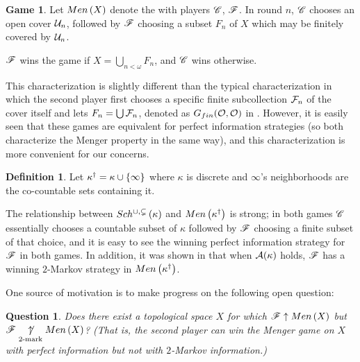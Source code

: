 \documentclass{amsart}
\theoremstyle{plain}
\newtheorem{question}[theorem]{Question}
\theoremstyle{definition}
\newtheorem{definition}[theorem]{Definition}
\newtheorem{game}[theorem]{Game}
\theoremstyle{remark}
\theoremstyle{plain}
\theoremstyle{definition}
\theoremstyle{remark}
\begin{document}
  \begin{game}
    Let \(Men\left({X}\right)\) denote the  with players \(\mathscr{C}\),
    \(\mathscr{F}\).
    In round \(n\), \(\mathscr{C}\) chooses an open cover \(\mathcal{U}_n\), followed by
    \(\mathscr{F}\) choosing a
    subset \(F_n\) of \(X\) which may be finitely covered by \(\mathcal{U}_n\).

    \(\mathscr{F}\) wins the game if \(X = \bigcup_{n<\omega}F_n\),
    and \(\mathscr{C}\) wins otherwise.
  \end{game}

  This characterization is slightly different than the typical characterization
  in which the second player first chooses a specific
  finite subcollection \(\mathcal{F}_n\) of the cover itself and lets
  \(F_n=\bigcup \mathcal{F}_n\), denoted as \(G_{fin}(\mathcal{O},\mathcal{O})\)
  in \cite{MR1378387}.
  However, it is easily seen that these games are equivalent
  for perfect information strategies (so both characterize
  the Menger property in the same way), and this characterization is
  more convenient for our concerns.

  \begin{definition}
    Let \(\kappa^\dagger=\kappa\cup\{\infty\}\) where \(\kappa\) is
    discrete and \(\infty\)'s neighborhoods are the co-countable sets
    containing it.
  \end{definition}

  The relationship between \(Sch^{\cup,\subsetneq}\left({\kappa}\right)\) and
  \(Men\left({\kappa^\dagger}\right)\) is strong; in both games \(\mathscr{C}\) essentially
  chooses a countable subset of \(\kappa\) followed by \(\mathscr{F}\) choosing
  a finite subset of that choice, and it is easy to see the winning perfect
  information strategy for \(\mathscr{F}\) in both games.
  In addition, it was shown in
  \cite{clontzMengerGamePreprint} that when \(\mathcal{A}(\kappa)\) holds,
  \(\mathscr{F}\) has a winning \(2\)-Markov strategy in
  \(Men\left({\kappa^\dagger}\right)\).

  One source of motivation is to make progress on the following open question:

  \begin{question}\label{mainQuestion}
    Does there exist a topological space \(X\) for which
    \(\mathscr{F}\uparrow Men\left({X}\right)\) but \(\mathscr{F}\underset{2\text{-mark}}{\not\uparrow}Men\left({X}\right)\)?
    (That is, the second player can win the Menger game on \(X\)
    with perfect information but not with \(2\)-Markov information.)
  \end{question}
\end{document}
